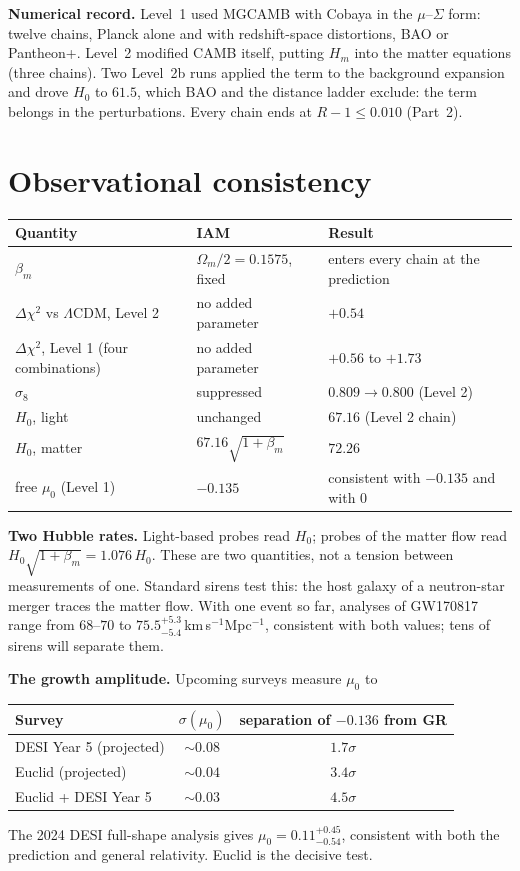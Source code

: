 \textbf{Numerical record.} Level~1 used MGCAMB with Cobaya in the $\mu$--$\Sigma$ form: twelve chains, Planck alone and with redshift-space distortions,
BAO or Pantheon+. Level~2 modified CAMB itself, putting $H_m$ into the matter equations (three chains). Two Level~2b runs applied the term to the
background expansion and drove $H_0$ to $61.5$, which BAO and the distance ladder exclude: the term belongs in the perturbations. Every chain ends at
$R-1\le0.010$ (Part~2).

\section{Observational consistency}
\begin{center}\small
\begin{tabular}{lll}
\hline
Quantity & IAM & Result\\\hline
$\beta_m$ & $\Omega_m/2=0.1575$, fixed & enters every chain at the prediction\\
$\Delta\chi^2$ vs $\Lambda$CDM, Level 2 & no added parameter & $+0.54$\\
$\Delta\chi^2$, Level 1 (four combinations) & no added parameter & $+0.56$ to $+1.73$\\
$\sigma_8$ & suppressed & $0.809\to0.800$ (Level 2)\\
$H_0$, light & unchanged & $67.16$ (Level 2 chain)\\
$H_0$, matter & $67.16\sqrt{1+\beta_m}$ & $72.26$\\
free $\mu_0$ (Level 1) & $-0.135$ & consistent with $-0.135$ and with $0$\\\hline
\end{tabular}
\end{center}

\textbf{Two Hubble rates.} Light-based probes read $H_0$; probes of the matter flow read $H_0\sqrt{1+\beta_m}=1.076\,H_0$. These are two quantities, not a
tension between measurements of one. Standard sirens test this: the host galaxy of a neutron-star merger traces the matter flow. With one event so far,
analyses of GW170817 range from $68$--$70$ to $75.5^{+5.3}_{-5.4}$\,km\,s$^{-1}$Mpc$^{-1}$, consistent with both values; tens of sirens will separate
them.

\textbf{The growth amplitude.} Upcoming surveys measure $\mu_0$ to
\begin{center}\small
\begin{tabular}{lcc}
\hline
Survey & $\sigma(\mu_0)$ & separation of $-0.136$ from GR\\\hline
DESI Year 5 (projected) & $\sim0.08$ & $1.7\sigma$\\
Euclid (projected) & $\sim0.04$ & $3.4\sigma$\\
Euclid + DESI Year 5 & $\sim0.03$ & $4.5\sigma$\\\hline
\end{tabular}
\end{center}
The 2024 DESI full-shape analysis gives $\mu_0=0.11^{+0.45}_{-0.54}$, consistent with both the prediction and general relativity. Euclid is the decisive test.

